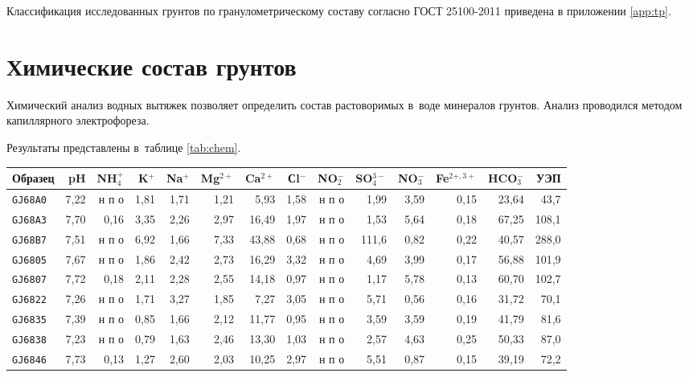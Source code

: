 Классификация исследованных грунтов по гранулометрическому составу согласно ГОСТ 25100-2011 \cite{gost25100} приведена в приложении \ref{app:tp}.

 
\section{Химические состав грунтов}

Химический анализ водных вытяжек позволяет определить состав растоворимых в~воде минералов грунтов.
Анализ проводился методом капиллярного электрофореза. 

Результаты представлены в~таблице \ref{tab:chem}.

\begin{sidewaystable}[p]
    \centering
    \small
    \caption{Химических состав водных вытяжек грунтов} \label{tab:chem}
    \begin{tabular}{@{}lrrrrrrrrrrrrr@{}}
    \toprule
    Образец & pH & NH$_4^+$ &	K$^+$ & Na$^+$ & Mg$^{2+}$ & Ca$^{2+}$ &	Сl$^-$ &	NO$_2^-$	   & SO$_4^{3-}$ &	NO$_3^-$ &	Fe$^{2+,3+}$ &	HCO$_3^-$   & УЭП \\ \midrule
    \texttt{GJ68A0} & 7,22 & н п о & 1,81 & 1,71 & 1,21 &  5,93 & 1,58 & н п о &  1,99 & 3,59 & 0,15 & 23,64 &  43,7 \\
    \texttt{GJ68A3} & 7,70 & 0,16  & 3,35 & 2,26 & 2,97 & 16,49 & 1,97 & н п о &  1,53 & 5,64 & 0,18 & 67,25 & 108,1 \\
    \texttt{GJ68B7} & 7,51 & н п о & 6,92 & 1,66 & 7,33 & 43,88 & 0,68 & н п о & 111,6 & 0,82 & 0,22 & 40,57 & 288,0 \\
    \texttt{GJ6805} & 7,67 & н п о & 1,86 & 2,42 & 2,73 & 16,29 & 3,32 & н п о &  4,69 & 3,99 & 0,17 & 56,88 & 101,9 \\
    \texttt{GJ6807} & 7,72 & 0,18  & 2,11 & 2,28 & 2,55 & 14,18 & 0,97 & н п о &  1,17 & 5,78 & 0,13 & 60,70 & 102,7 \\
    \texttt{GJ6822} & 7,26 & н п о & 1,71 & 3,27 & 1,85 &  7,27 & 3,05 & н п о &  5,71 & 0,56 & 0,16 & 31,72 &  70,1 \\
    \texttt{GJ6835} & 7,39 & н п о & 0,85 & 1,66 & 2,12 & 11,77 & 0,95 & н п о &  3,59 & 3,59 & 0,19 & 41,79 &  81,6 \\
    \texttt{GJ6838} & 7,23 & н п о & 0,79 & 1,63 & 2,46 & 13,30 & 1,03 & н п о &  2,57 & 4,63 & 0,25 & 50,33 &  87,0 \\
    \texttt{GJ6846} & 7,73 & 0,13  & 1,27 & 2,60 & 2,03 & 10,25 & 2,97 & н п о &  5,51 & 0,87 & 0,15 & 39,19 &  72,2 \\

\end{tabular}
\end{sidewaystable}

